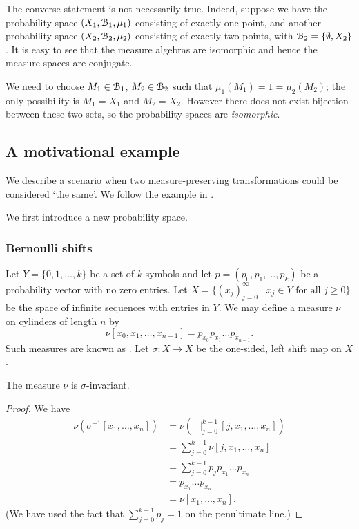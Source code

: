 The converse statement is not necessarily true. Indeed, suppose we have the probability space $(X_1, \mathcal{B}_1, \mu_1)$ consisting of exactly one point, and another probability space $(X_2, \mathcal{B}_2, \mu_2)$ consisting of exactly two points, with $\mathcal{B}_2 = \{\emptyset, X_2\}$. It is easy to see that the measure algebras are isomorphic and hence the measure spaces are conjugate.

We need to choose $M_1 \in \mathcal{B}_1$, $M_2 \in \mathcal{B}_2$ such that $\mu_1(M_1) = 1 = \mu_2(M_2)$; the only possibility is $M_1 = X_1$ and $M_2 = X_2$. However there does not exist bijection between these two sets, so the probability spaces are \emph{isomorphic}.

\subsection{A motivational example}
We describe a scenario when two measure-preserving transformations could be considered `the same'. We follow the example in \cite[p58]{walters:intro-to-ergodic-theory}.

We first introduce a new probability space.

\begin{comment}
Let $Y = \{0, 1\}$ and let $(p_0, p_1)$ be a probability vector with no zero entries. Then $(Y, 2^Y, \nu)$ is a measure space, with measure $\nu$ defined by $\nu(y) = p_y$ for $y \in Y$. Now let $X = \{(x_j)_{j = 0}^\infty \mid x_j \in Y\}$, the space of infinite sequences with entries in $Y = \{0, 1\}$.
\end{comment}
\subsubsection{Bernoulli shifts}
Let $Y = \{0, 1, \dots, k\}$ be a set of $k$ symbols and let $p = (p_0, p_1, \dots, p_k)$ be a probability vector with no zero entries. Let $X = \{(x_j)_{j = 0}^\infty \mid x_j \in Y \text{ for all } j \geq 0\}$ be the space of infinite sequences with entries in $Y$. We may define a measure $\nu$ on cylinders of length $n$ by
\[
	\nu[x_0, x_1, \dots, x_{n - 1}] = p_{x_0} p_{x_1} \dots p_{x_{n - 1}}.
\]
Such measures are known as . Let $\sigma : X \to X$ be the one-sided, left shift map on $X$.

\begin{proposition}
	The measure $\nu$ is $\sigma$-invariant.
	\begin{proof}
		We have
		\begin{align*}
			\nu(\sigma^{-1}[x_1, \dots, x_n]) &= \nu\left(\bigsqcup_{j = 0}^{k - 1}{[j, x_1, \dots, x_n]}\right) \\
				&= \sum_{j = 0}^{k - 1}{\nu[j, x_1, \dots, x_n]} \\
				&= \sum_{j = 0}^{k - 1}{p_j p_{x_1} \dots p_{x_n}} \\
				&= p_{x_1} \dots p_{x_n} \\
				&= \nu[x_1, \dots, x_n].
		\end{align*}
		(We have used the fact that $\sum_{j = 0}^{k - 1}{p_j} = 1$ on the penultimate line.)
	\end{proof}
\end{proposition}

